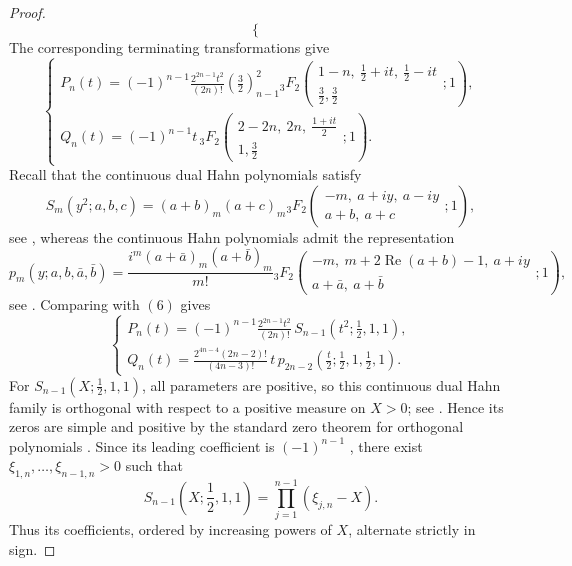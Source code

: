 \documentclass[11pt,twoside]{article}
\numberwithin{equation}{section}
\begin{document}
\begin{proof}
\[\begin{cases}
\end{cases}
\tag{5}
\]
The corresponding terminating transformations give
\[
\begin{cases} \displaystyle P_n(t) = (-1)^{n-1} \frac{2^{2n-1}t^2}{(2n)!} \left(\frac32\right)_{n-1}^{\!2} {}_3F_2\!\left( \begin{matrix} 1-n,\ \frac12+it,\ \frac12-it\\ \frac32,\frac32 \end{matrix};1 \right),\\[5mm] \displaystyle Q_n(t) = (-1)^{n-1}t\, {}_3F_2\!\left( \begin{matrix} 2-2n,\ 2n,\ \frac{1+it}{2}\\ 1,\frac32 \end{matrix};1 \right).
\end{cases}
\tag{6}
\]
Recall that the continuous dual Hahn polynomials satisfy
\[
S_m(y^2;a,b,c) = (a+b)_m(a+c)_m {}_3F_2\!\left( \begin{matrix} -m,\ a+iy,\ a-iy\\ a+b,\ a+c \end{matrix};1 \right),
\]
see \cite[Eq.~(18.26.2)]{NIST:DLMF}, whereas the continuous Hahn polynomials admit the
representation
\[
p_m(y;a,b,\bar a,\bar b) = \frac{i^m(a+\bar a)_m(a+\bar b)_m}{m!} {}_3F_2\!\left( \begin{matrix} -m,\ m+2\operatorname{Re}(a+b)-1,\ a+iy\\ a+\bar a,\ a+\bar b \end{matrix};1 \right),
\]
see \cite[Eq.~(18.20.9)]{NIST:DLMF}. Comparing with \((6)\) gives
\[
\begin{cases} \displaystyle P_n(t) = (-1)^{n-1} \frac{2^{2n-1}t^2}{(2n)!}\, S_{n-1}\!\left(t^2;\frac12,1,1\right),\\[4mm] \displaystyle Q_n(t) = \frac{2^{4n-4}(2n-2)!}{(4n-3)!}\, t\, p_{2n-2}\!\left( \frac t2;\frac12,1,\frac12,1 \right).
\end{cases}
\tag{7}
\]
For \(S_{n-1}(X;\frac12,1,1)\), all parameters are positive, so this continuous dual Hahn
family is orthogonal with respect to a positive measure on \(X>0\); see \cite[Table~18.25.1
and Eqs.~(18.25.6)--(18.25.8)]{NIST:DLMF}. Hence its zeros are simple and positive by the
standard zero theorem for orthogonal polynomials \cite[\S18.2(vi)]{NIST:DLMF}. Since its
leading coefficient is \((-1)^{n-1}\) \cite[Table~18.25.2]{NIST:DLMF}, there exist
\(\xi_{1,n},\ldots,\xi_{n-1,n}>0\) such that
\[
S_{n-1}\!\left(X;\frac12,1,1\right) = \prod_{j=1}^{n-1}(\xi_{j,n}-X). \tag{8}
\]
Thus its coefficients, ordered by increasing powers of \(X\), alternate strictly in sign.

\end{proof}
\end{document}

